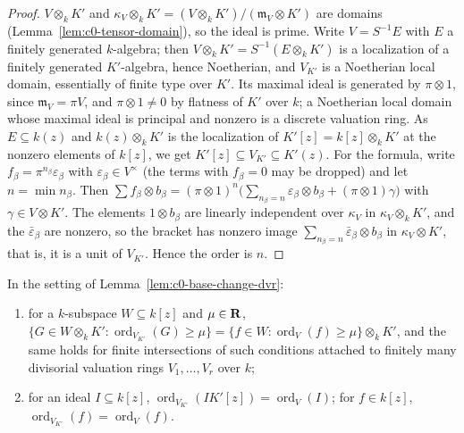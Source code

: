 \begin{proof}
$V\otimes_kK'$ and $\kappa_V\otimes_kK'=(V\otimes_kK')/(\mathfrak m_V\otimes K')$ are domains (Lemma~\ref{lem:c0-tensor-domain}), so the
ideal is prime. Write $V=S^{-1}E$ with $E$ a finitely generated $k$-algebra; then $V\otimes_kK'=S^{-1}(E\otimes_kK')$ is a
localization of a finitely generated $K'$-algebra, hence Noetherian, and $V_{K'}$ is a Noetherian local domain, essentially
of finite type over $K'$. Its maximal ideal is generated by $\pi\otimes1$, since $\mathfrak m_V=\pi V$, and $\pi\otimes1\ne0$ by
flatness of $K'$ over $k$; a Noetherian local domain whose maximal ideal is principal and nonzero is a discrete
valuation ring. As $E\subseteq k(z)$ and $k(z)\otimes_kK'$ is the localization of $K'[z]=k[z]\otimes_kK'$ at the nonzero elements
of $k[z]$, we get $K'[z]\subseteq V_{K'}\subseteq K'(z)$.
For the formula, write $f_\beta=\pi^{n_\beta}\varepsilon_\beta$ with $\varepsilon_\beta\in V^\times$ (the terms with $f_\beta=0$ may be dropped) and let
$n=\min n_\beta$. Then $\sum f_\beta\otimes b_\beta=(\pi\otimes1)^n\bigl(\sum_{n_\beta=n}\varepsilon_\beta\otimes b_\beta+(\pi\otimes1)\gamma\bigr)$ with
$\gamma\in V\otimes K'$. The elements $1\otimes b_\beta$ are linearly independent over $\kappa_V$ in $\kappa_V\otimes_kK'$, and the
$\bar\varepsilon_\beta$ are nonzero, so the bracket has nonzero image $\sum_{n_\beta=n}\bar\varepsilon_\beta\otimes b_\beta$ in $\kappa_V\otimes K'$, that is, it
is a unit of $V_{K'}$. Hence the order is $n$.
\end{proof}

\begin{corollary}\label{cor:c0-base-change-orders}
\leanok
{}
In the setting of Lemma~\ref{lem:c0-base-change-dvr}:
\begin{enumerate}
\item for a $k$-subspace $W\subseteq k[z]$ and $\mu\in\mathbf{R}$,
$\{G\in W\otimes_kK':\operatorname{ord}_{V_{K'}}(G)\ge\mu\}=\{f\in W:\operatorname{ord}_V(f)\ge\mu\}\otimes_kK'$, and the same holds for finite
intersections of such conditions attached to finitely many divisorial valuation rings $V_1,\dots,V_r$ over $k$;
\item for an ideal $I\subseteq k[z]$, $\operatorname{ord}_{V_{K'}}(IK'[z])=\operatorname{ord}_V(I)$; for $f\in k[z]$, $\operatorname{ord}_{V_{K'}}(f)=\operatorname{ord}_V(f)$.
\end{enumerate}
\end{corollary}

